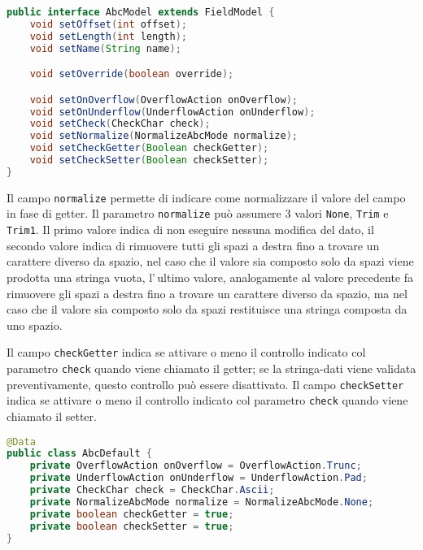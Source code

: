 \documentclass[a4paper,10pt]{report}
\begin{document}
\begin{figure*}[!htb]
\begin{lstlisting}[language=java, 
caption=interfaccia AbcModel (campo alfanumerico), 
label=lst:AbcModel]
public interface AbcModel extends FieldModel {
    void setOffset(int offset);
    void setLength(int length);
    void setName(String name);

    void setOverride(boolean override);

    void setOnOverflow(OverflowAction onOverflow);
    void setOnUnderflow(UnderflowAction onUnderflow);
    void setCheck(CheckChar check);
    void setNormalize(NormalizeAbcMode normalize);
    void setCheckGetter(Boolean checkGetter);
    void setCheckSetter(Boolean checkSetter);
}
\end{lstlisting}
\end{figure*}

Il campo \hypertarget{abc:nrm}{\texttt{normalize}} permette di indicare come 
normalizzare il valore del campo in fase di getter.
Il parametro \verb!normalize! può assumere 3 valori \verb!None!, \verb!Trim! e
\verb!Trim1!. Il primo valore indica di non eseguire nessuna modifica del dato,
il secondo valore indica di rimuovere tutti gli spazi a destra fino a trovare
un carattere diverso da spazio, nel caso che il valore sia composto solo da
spazi viene prodotta una stringa vuota, l'\,ultimo valore, analogamente al 
valore precedente fa rimuovere gli spazi a destra fino a trovare un carattere
diverso da spazio, ma nel caso che il valore sia composto solo da spazi 
restituisce una stringa composta da uno spazio.

Il campo \hypertarget{abc:get}{\texttt{checkGetter}} indica se attivare o meno 
il controllo indicato col parametro \verb!check! quando viene chiamato il 
getter; se la stringa-dati viene validata preventivamente, questo controllo può 
essere disattivato.
Il campo \hypertarget{abc:set}{\texttt{checkSetter}} indica se attivare o meno 
il controllo indicato col parametro \verb!check! quando viene chiamato il 
setter.

\begin{figure*}[!htb]
\begin{lstlisting}[language=java, 
caption=class AbcDefault (default campo alfanumerico), 
label=lst:AbcDefault]
@Data
public class AbcDefault {
    private OverflowAction onOverflow = OverflowAction.Trunc;
    private UnderflowAction onUnderflow = UnderflowAction.Pad;
    private CheckChar check = CheckChar.Ascii;
    private NormalizeAbcMode normalize = NormalizeAbcMode.None;
    private boolean checkGetter = true;
    private boolean checkSetter = true;
}
\end{lstlisting}
\end{figure*}
\end{document}
